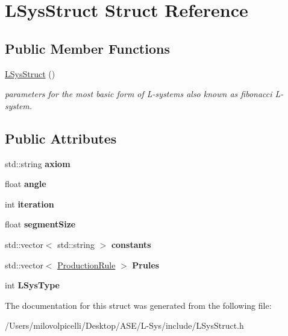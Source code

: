 \hypertarget{struct_l_sys_struct}{}\section{L\+Sys\+Struct Struct Reference}
\label{struct_l_sys_struct}
\subsection*{Public Member Functions}
\begin{DoxyCompactItemize}
\item 
\mbox{\label{struct_l_sys_struct_af20caf20eef16ee03fc6ac1da3ee1564}} 
\hyperlink{struct_l_sys_struct_af20caf20eef16ee03fc6ac1da3ee1564}{L\+Sys\+Struct} ()
\begin{DoxyCompactList}\small\item\em parameters for the most basic form of L-\/systems also known as fibonacci L-\/system. \end{DoxyCompactList}\end{DoxyCompactItemize}
\subsection*{Public Attributes}
\begin{DoxyCompactItemize}
\item 
\mbox{\label{struct_l_sys_struct_ab3b28dfeda62d85ed85f73577999a0bf}} 
std\+::string {\bfseries axiom}
\item 
\mbox{\label{struct_l_sys_struct_a0120231346b168a1b0b8a0a0e6e8990f}} 
float {\bfseries angle}
\item 
\mbox{\label{struct_l_sys_struct_a083beb47f248b15d69083cf508f40ac4}} 
int {\bfseries iteration}
\item 
\mbox{\label{struct_l_sys_struct_abcc7b7f718fa02f261b3164e1a2c3d7b}} 
float {\bfseries segment\+Size}
\item 
\mbox{\label{struct_l_sys_struct_ae123ccad0c2314b7ff4303ab60666c48}} 
std\+::vector$<$ std\+::string $>$ {\bfseries constants}
\item 
\mbox{\label{struct_l_sys_struct_a6ea00053267d726ecc73ee3afab0545d}} 
std\+::vector$<$ \hyperlink{struct_production_rule}{Production\+Rule} $>$ {\bfseries Prules}
\item 
\mbox{\label{struct_l_sys_struct_a3bfaacbb67090d465175c86ad575354c}} 
int {\bfseries L\+Sys\+Type}
\end{DoxyCompactItemize}


The documentation for this struct was generated from the following file\+:\begin{DoxyCompactItemize}
\item 
/\+Users/milovolpicelli/\+Desktop/\+A\+S\+E/\+L-\/\+Sys/include/L\+Sys\+Struct.\+h\end{DoxyCompactItemize}
